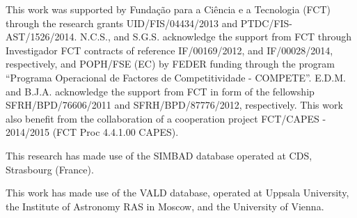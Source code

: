 \documentclass{aa}
\begin{document}
\begin{acknowledgements}

This work was supported by Funda\c{c}\~ao para a Ci\^encia e a
Tecnologia (FCT) through the research grants UID/FIS/04434/2013 and
PTDC/FIS-AST/1526/2014. N.C.S., and S.G.S. acknowledge the support from
FCT through Investigador FCT contracts of reference IF/00169/2012, and
IF/00028/2014, respectively, and POPH/FSE (EC) by FEDER funding through
the program “Programa Operacional de Factores de Competitividade
- COMPETE”. E.D.M. and B.J.A. acknowledge the support from FCT in
form of the fellowship SFRH/BPD/76606/2011 and SFRH/BPD/87776/2012,
respectively. This work also benefit from the collaboration of a
cooperation project FCT/CAPES - 2014/2015 (FCT Proc 4.4.1.00 CAPES).

This research has made use of the SIMBAD database operated at CDS,
Strasbourg (France).

This work has made use of the VALD database, operated at Uppsala
University, the Institute of Astronomy RAS in Moscow, and the University
of Vienna.

\end{acknowledgements}








\end{document}
